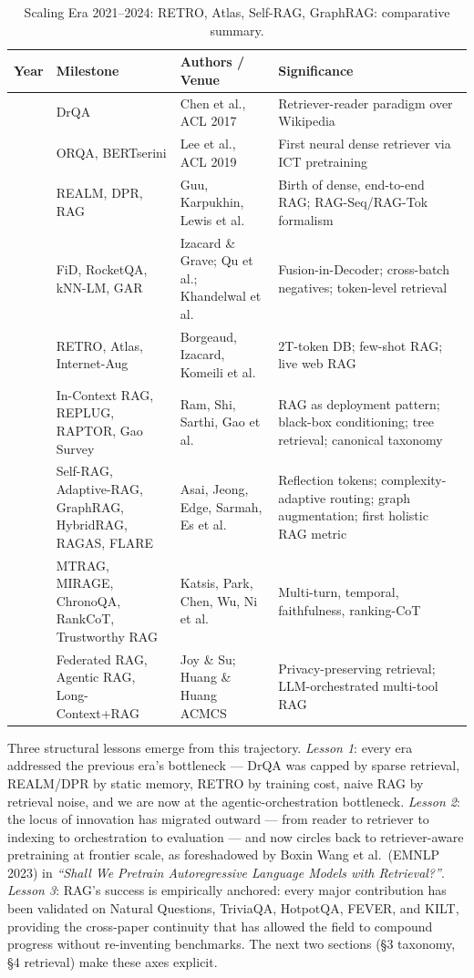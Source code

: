 \documentclass{article}
\begin{document}
\begin{table}[t]
\centering
\caption{Scaling Era 2021--2024: RETRO, Atlas, Self-RAG, GraphRAG: comparative summary.}
\label{tab:scaling-era-2021-2024-retro-atlas-self-rag-graphrag}
\begin{tabular}{>{\raggedright\arraybackslash}p{0.0201\linewidth}
  >{\raggedright\arraybackslash}p{0.2864\linewidth}
  >{\raggedright\arraybackslash}p{0.2261\linewidth}
  >{\raggedright\arraybackslash}p{0.4673\linewidth}}
\toprule
Year & Milestone & Authors / Venue & Significance \\
\midrule
2017 & DrQA & Chen et al., ACL 2017 & Retriever-reader paradigm over Wikipedia \\
2019 & ORQA, BERTserini & Lee et al., ACL 2019 & First neural dense retriever via ICT pretraining \\
2020 & REALM, DPR, RAG & Guu, Karpukhin, Lewis et al. & Birth of dense, end-to-end RAG; RAG-Seq/RAG-Tok formalism \\
2021 & FiD, RocketQA, kNN-LM, GAR & Izacard \& Grave; Qu et al.; Khandelwal et al. & Fusion-in-Decoder; cross-batch negatives; token-level retrieval \\
2022 & RETRO, Atlas, Internet-Aug & Borgeaud, Izacard, Komeili et al. & 2T-token DB; few-shot RAG; live web RAG \\
2023 & In-Context RAG, REPLUG, RAPTOR, Gao Survey & Ram, Shi, Sarthi, Gao et al. & RAG as deployment pattern; black-box conditioning; tree retrieval; canonical taxonomy \\
2024 & Self-RAG, Adaptive-RAG, GraphRAG, HybridRAG, RAGAS, FLARE & Asai, Jeong, Edge, Sarmah, Es et al. & Reflection tokens; complexity-adaptive routing; graph augmentation; first holistic RAG metric \\
2025 & MTRAG, MIRAGE, ChronoQA, RankCoT, Trustworthy RAG & Katsis, Park, Chen, Wu, Ni et al. & Multi-turn, temporal, faithfulness, ranking-CoT \\
2026 & Federated RAG, Agentic RAG, Long-Context+RAG & Joy \& Su; Huang \& Huang ACMCS & Privacy-preserving retrieval; LLM-orchestrated multi-tool RAG \\
\end{tabular}
\end{table}

Three structural lessons emerge from this trajectory. \emph{Lesson 1}: every era addressed the previous era's bottleneck --- DrQA was capped by sparse retrieval, REALM/DPR by static memory, RETRO by training cost, naive RAG by retrieval noise, and we are now at the agentic-orchestration bottleneck. \emph{Lesson 2}: the locus of innovation has migrated outward --- from reader to retriever to indexing to orchestration to evaluation --- and now circles back to retriever-aware pretraining at frontier scale, as foreshadowed by Boxin Wang et al.~(EMNLP 2023) in \emph{``Shall We Pretrain Autoregressive Language Models with Retrieval?''}. \emph{Lesson 3}: RAG's success is empirically anchored: every major contribution has been validated on Natural Questions, TriviaQA, HotpotQA, FEVER, and KILT, providing the cross-paper continuity that has allowed the field to compound progress without re-inventing benchmarks. The next two sections (§3 taxonomy, §4 retrieval) make these axes explicit.
\end{document}
